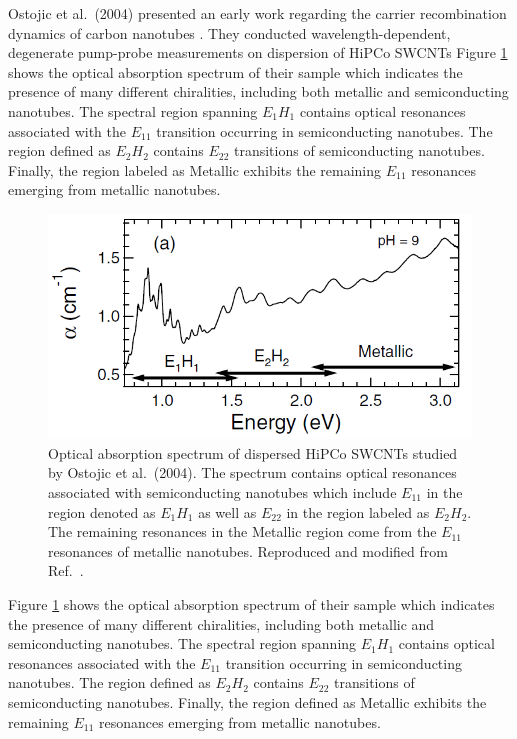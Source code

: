 Ostojic et al.\ (2004) presented an early work regarding the carrier recombination dynamics of carbon nanotubes \cite{ostojic2004interband}. They conducted wavelength-dependent, degenerate pump-probe measurements on dispersion of HiPCo SWCNTs %
Figure \ref{fig:abs_gordana} shows the optical absorption spectrum of their sample which indicates the presence of many different chiralities, including both metallic and semiconducting nanotubes. The spectral region spanning $E_{1} H_{1}$ contains optical resonances associated with the $E_{11}$ transition occurring in semiconducting nanotubes. The region defined as $E_{2} H_{2}$ contains $E_{22}$ transitions of semiconducting nanotubes. Finally, the region labeled as Metallic exhibits the remaining $E_{11}$ resonances emerging from metallic nanotubes.

\begin{figure}[ht]
	\centering
	\includegraphics[scale=0.7]{images/chapter_prior_works/abs_gordana}

	\caption{Optical absorption spectrum of dispersed HiPCo SWCNTs studied by Ostojic et al.\ (2004). The spectrum contains optical resonances associated with semiconducting nanotubes which include $E_{11}$ in the region denoted as $E_{1} H_{1}$ as well as  $E_{22}$ in the region labeled as $E_{2} H_{2}$. The remaining resonances in the Metallic region come from the $E_{11}$ resonances of metallic nanotubes. Reproduced and modified from Ref.\ \cite{ostojic2004interband}.}
	\label{fig:abs_gordana}
\end{figure}


Figure \ref{fig:abs_gordana} shows the optical absorption spectrum of their sample which indicates the presence of many different chiralities, including both metallic and semiconducting nanotubes. The spectral region spanning $E_{1} H_{1}$ contains optical resonances associated with the $E_{11}$ transition occurring in semiconducting nanotubes. The region defined as $E_{2} H_{2}$ contains $E_{22}$ transitions of semiconducting nanotubes. Finally, the region defined as Metallic exhibits the remaining $E_{11}$ resonances emerging from metallic nanotubes.

